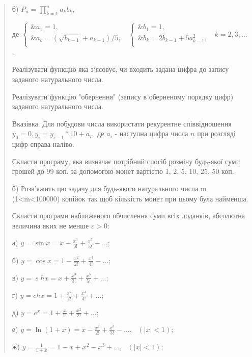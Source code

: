 \documentclass[]{article}
\begin{document}
\begin{quote}
б) \(P_{n} = \prod_{k = 1}^{n}{a_{k}b_{k},}\)

де \(\left\{ \begin{matrix}
\& a_{1} = 1, \\
\& a_{k} = \left( \sqrt{b_{k - 1}} + a_{k - 1} \right)/5, \\
\end{matrix} \right.\ \) \(\left\{ \begin{matrix}
\& b_{1} = 1, \\
\& b_{k} = 2b_{k - 1} + 5a_{k - 1}^{2}, \\
\end{matrix} \right.\ \) \(k = 2,3,\ldots\).

Реалізувати функцію яка з`ясовує, чи входить задана цифра до запису
заданого натурального числа.

Реалізувати функцію "обернення" (запису в оберненому порядку цифр)
заданого натурального числа.

Вказівка. Для побудови числа використати рекурентне співвідношення
\(y_{0} = 0,y_{i} = y_{i - 1}*10 + a_{i},\) де \(a_{i}\) - наступна
цифра числа \(n\) при розгляді цифр справа наліво.

Скласти програму, яка визначає потрібний спосіб розміну будь-якої суми
грошей до 99 коп. за допомогою монет вартістю 1, 2, 5, 10, 25, 50 коп.

б) Розв'яжить цю задачу для будь-якого натурального числа m
(1\textless{}m\textless{}100000) копійок так щоб кількість монет при
цьому була найменша.

Скласти програми наближеного обчислення суми всіх доданків, абсолютна
величина яких не менше $\varepsilon >0$:

\protect\hypertarget{_Hlk65241997}{}{}а)
\(y = \sin x = x - \frac{x^{3}}{3!} + \frac{x^{5}}{5!} - \ldots;\)

б) \(y = \cos x = 1 - \frac{x^{2}}{2!} + \frac{x^{4}}{4!} - \ldots;\)

в)
\(y = \operatorname{s}hx = x + \frac{x^{3}}{3!} + \frac{x^{5}}{5!} + \ldots;\)

г) \(y = chx = 1 + \frac{x^{2}}{2!} + \frac{x^{4}}{4!} + \ldots;\)

д) \(y = e^{x} = 1 + \frac{x}{1!} + \frac{x^{2}}{2!} + \ldots;\)

е)
\(y = \ln(1 + x) = x - \frac{x^{2}}{2!} + \frac{x^{3}}{3!} - \ldots,\mathrm{\text{\ \ \ \ \ }}(\left| x \right| < 1);\)

ж)
\(y = \frac{1}{1 + x} = 1 - x + x^{2} - x^{3} + \ldots,\mathrm{\text{\ \ \ \ \ }}(\left| x \right| < 1);\)


\end{quote}
\end{document}
